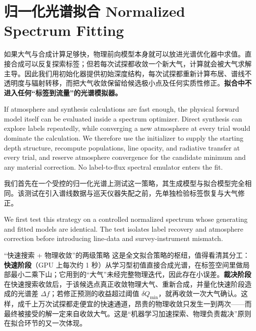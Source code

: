 \section{归一化光谱拟合 Normalized Spectrum Fitting}\label{sec:fitter}

如果大气与合成计算足够快，物理前向模型本身就可以放进光谱优化器中求值。直接合成可以反复探索标签；但若每次试探都收敛一个新大气，计算就会被大气求解主导。因此我们用初始化器提供初始深度结构，每次试探都重新计算布居、谱线不透明度与辐射转移，而把大气收敛保留给候选极小点及任何实质性修正。\textbf{拟合中不进入任何“标签到流量”的光谱模拟器。}

\begin{EN}
If atmosphere and synthesis calculations are fast enough, the physical forward
model itself can be evaluated inside a spectrum optimizer. Direct synthesis can
explore labels repeatedly, while converging a new atmosphere at every trial
would dominate the calculation. We therefore use the initializer to supply the
starting depth structure, recompute populations, line opacity, and radiative
transfer at every trial, and reserve atmosphere convergence for the candidate
minimum and any material correction. No label-to-flux spectral emulator enters
the fit.
\end{EN}

我们首先在一个受控的归一化光谱上测试这一策略，其生成模型与拟合模型完全相同。该测试在引入谱线数据与巡天仪器失配之前，先单独检验标签恢复与大气修正。

\begin{EN}
We first test this strategy on a controlled normalized spectrum whose
generating and fitted models are identical. The test isolates label recovery
and atmosphere correction before introducing line-data and survey-instrument
mismatch.
\end{EN}

\begin{physbox}{“快速搜索 + 物理收敛”的两级策略}
这是全文拟合策略的枢纽，值得看清其分工：\textbf{快速阶段}（GPU 上每次约 1 秒）从学习型初值直接合成光谱，在标签空间里做局部最小二乘下山；它用到的“大气”未经完整物理迭代，因此存在小误差。\textbf{裁决阶段}在快速搜索收敛后，于该候选点真正收敛物理大气、重新合成，并量化快速阶段造成的光谱差 $\Delta f$；若修正预测的收益超过阈值 $\delta Q_{\min}$，就再收敛一次大气确认。这样，成千上万次试探都走便宜的快速通道，昂贵的物理收敛只发生一到两次——而最终被接受的解一定来自收敛大气。这是“机器学习加速探索、物理负责裁决”原则在拟合环节的又一次体现。
\end{physbox}

